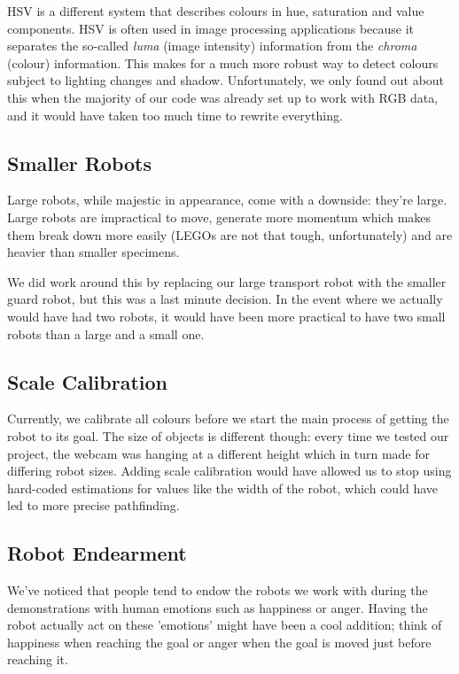 \documentclass[10pt, abstracton, twocolumn]{scrartcl}
\begin{document}
\begin{appendices}
HSV is a different system that describes colours in hue, saturation and value components. HSV is often used in image processing applications because it separates the so-called \textit{luma} (image intensity) information from the \textit{chroma} (colour) information. This makes for a much more robust way to detect colours subject to lighting changes and shadow. Unfortunately, we only found out about this when the majority of our code was already set up to work with RGB data, and it would have taken too much time to rewrite everything.

\subsection{Smaller Robots}
Large robots, while majestic in appearance, come with a downside: they're large. Large robots are impractical to move, generate more momentum which makes them break down more easily (LEGOs are not that tough, unfortunately) and are heavier than smaller specimens. 

We did work around this by replacing our large transport robot with the smaller guard robot, but this was a last minute decision. In the event where we actually would have had two robots, it would have been more practical to have two small robots than a large and a small one.

\subsection{Scale Calibration}
Currently, we calibrate all colours before we start the main process of getting the robot to its goal. The size of objects is different though: every time we tested our project, the webcam was hanging at a different height which in turn made for differing robot sizes. Adding scale calibration would have allowed us to stop using hard-coded estimations for values like the width of the robot, which could have led to more precise pathfinding.

\subsection{Robot Endearment}
We've noticed that people tend to endow the robots we work with during the demonstrations with human emotions such as happiness or anger. Having the robot actually act on these 'emotions' might have been a cool addition; think of happiness when reaching the goal or anger when the goal is moved just before reaching it.


\end{appendices}
\end{document}

